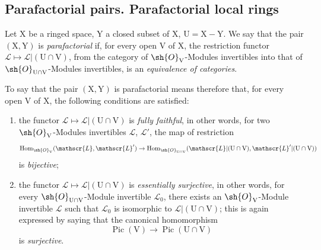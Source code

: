 \subsection{Parafactorial pairs. Parafactorial local rings}
\label{subsection:IV.21.13}

\begin{definition}[21.13.1]
\label{IV.21.13.1}
Let $\mathrm{X}$ be a ringed space, $\mathrm{Y}$ a closed subset of $\mathrm{X}$, $\mathrm{U}=\mathrm{X}-\mathrm{Y}$.
We say that the pair $(\mathrm{X},\mathrm{Y})$ is \emph{parafactorial} if, for every open $\mathrm{V}$ of $\mathrm{X}$, the restriction functor $\mathscr{L}\mapsto\mathscr{L}|(\mathrm{U}\cap\mathrm{V})$, from the category of $\sh{O}_{\mathrm{V}}$-Modules invertibles into that of $\sh{O}_{\mathrm{U}\cap\mathrm{V}}$-Modules invertibles, is an \emph{equivalence of categories}.
\end{definition}

To say that the pair $(\mathrm{X},\mathrm{Y})$ is parafactorial means therefore that, for every open $\mathrm{V}$ of $\mathrm{X}$, the following conditions are satisfied:
\begin{enumerate}[label=\arabic*\textsuperscript{o}]
  \item the functor $\mathscr{L}\mapsto\mathscr{L}|(\mathrm{U}\cap\mathrm{V})$ is \emph{fully faithful}, in other words, for two $\sh{O}_{\mathrm{V}}$-Modules invertibles $\mathscr{L}$, $\mathscr{L}'$, the map of restriction
  \[
    \operatorname{Hom}_{\sh{O}_{\mathrm{V}}}(\mathscr{L},\mathscr{L}')\to\operatorname{Hom}_{\sh{O}_{\mathrm{U}\cap\mathrm{V}}}(\mathscr{L}|(\mathrm{U}\cap\mathrm{V}),\mathscr{L}'|(\mathrm{U}\cap\mathrm{V}))
  \]
  is \emph{bijective};
  \item the functor $\mathscr{L}\mapsto\mathscr{L}|(\mathrm{U}\cap\mathrm{V})$ is \emph{essentially surjective}, in other words, for every $\sh{O}_{\mathrm{U}\cap\mathrm{V}}$-Module invertible $\mathscr{L}_0$, there exists an $\sh{O}_{\mathrm{V}}$-Module invertible $\mathscr{L}$ such that $\mathscr{L}_0$ is
isomorphic to $\mathscr{L}|(\mathrm{U}\cap\mathrm{V})$; this is again expressed by saying that the canonical homomorphism 
  \[
    \operatorname{Pic}(\mathrm{V})\to\operatorname{Pic}(\mathrm{U}\cap\mathrm{V})
  \]
  is \emph{surjective}.
\end{enumerate}

